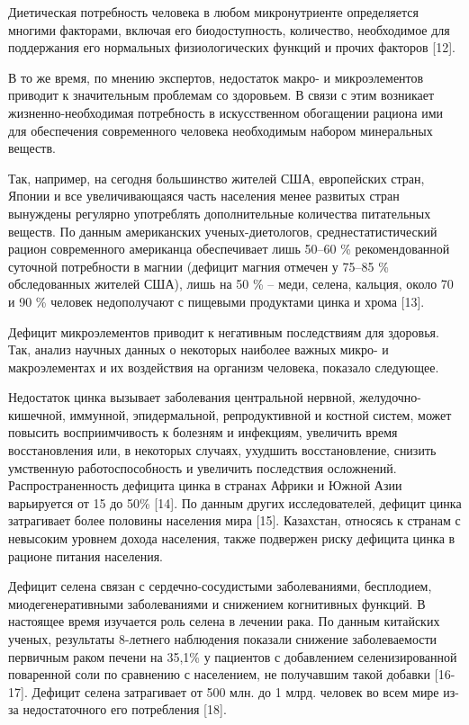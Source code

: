 \begin{multicols}{2}
Диетическая потребность человека в любом микронутриенте определяется
многими факторами, включая его биодоступность, количество, необходимое
для поддержания его нормальных физиологических функций и прочих факторов
{[}12{]}.

В то же время, по мнению экспертов, недостаток макро- и микроэлементов
приводит к значительным проблемам со здоровьем. В связи с этим возникает
жизненно-необходимая потребность в искусственном обогащении рациона ими
для обеспечения современного человека необходимым набором минеральных
веществ.

Так, например, на сегодня большинство жителей США, европейских стран,
Японии и все увеличивающаяся часть населения менее развитых стран
вынуждены регулярно употреблять дополнительные количества питательных
веществ. По данным американских ученых-диетологов, среднестатистический
рацион современного американца обеспечивает лишь 50--60 \%
рекомендованной суточной потребности в магнии (дефицит магния отмечен у
75--85 \% обследованных жителей США), лишь на 50 \% -- меди, селена,
кальция, около 70 и 90 \% человек недополучают с пищевыми продуктами
цинка и хрома {[}13{]}.

Дефицит микроэлементов приводит к негативным последствиям для здоровья.
Так, анализ научных данных о некоторых наиболее важных микро- и
макроэлементах и их воздействия на организм человека, показало
следующее.

Недостаток цинка вызывает заболевания центральной нервной,
желудочно-кишечной, иммунной, эпидермальной, репродуктивной и костной
систем, может повысить восприимчивость к болезням и инфекциям, увеличить
время восстановления или, в некоторых случаях, ухудшить восстановление,
снизить умственную работоспособность и увеличить последствия осложнений.
Распространенность дефицита цинка в странах Африки и Южной Азии
варьируется от 15 до 50\% {[}14{]}. По данным других исследователей,
дефицит цинка затрагивает более половины населения мира {[}15{]}.
Казахстан, относясь к странам с невысоким уровнем дохода населения,
также подвержен риску дефицита цинка в рационе питания населения.

Дефицит селена связан с сердечно-сосудистыми заболеваниями, бесплодием,
миодегенеративными заболеваниями и снижением когнитивных функций. В
настоящее время изучается роль селена в лечении рака. По данным
китайских ученых, результаты 8-летнего наблюдения показали снижение
заболеваемости первичным раком печени на 35,1\% у пациентов с
добавлением селенизированной поваренной соли по сравнению с населением,
не получавшим такой добавки {[}16-17{]}. Дефицит селена затрагивает от
500 млн. до 1 млрд. человек во всем мире из-за недостаточного его
потребления {[}18{]}.


\end{multicols}

